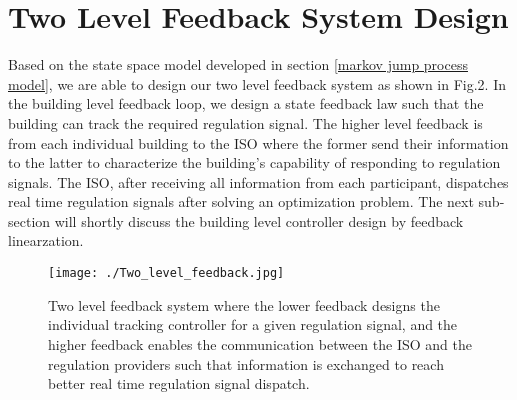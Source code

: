 \documentclass[journal]{IEEEtran}
\begin{document}
\section{Two Level Feedback System Design}
\label{two level feedback system design}
Based on the state space model developed in section \ref{markov jump process model}, we are able to design our two level feedback system as shown in Fig.2. In the building level feedback loop, we design a state feedback law such that the building can track the required regulation signal. The higher level feedback is from each individual building to the ISO where the former send their information to the latter to characterize the building's capability of responding to regulation signals. The ISO, after receiving all information from each participant, dispatches real time regulation signals after solving an optimization problem. The next sub-section will shortly discuss the building level controller design by feedback linearzation.
\begin{figure}[htb]
\centering
\label{Two_level_feedback}
\texttt{[image: ./Two\_level\_feedback.jpg]}
\caption{Two level feedback system where the lower feedback designs the individual tracking controller for a given regulation signal, and the higher feedback enables the communication between the ISO and the regulation providers such that information is exchanged to reach better real time regulation signal dispatch.}
\end{figure}
\end{document}
